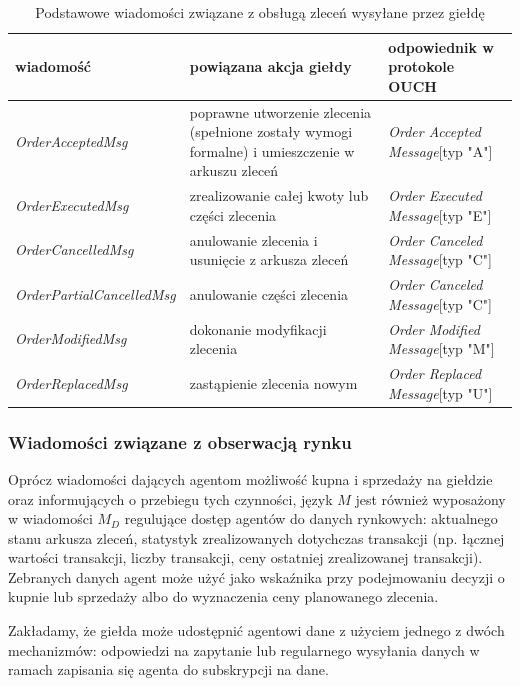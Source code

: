\begin{table}
\caption{Podstawowe wiadomości związane z obsługą zleceń wysyłane przez giełdę} 
\label{tab:ordermsgexchange}
\begin{center}
\begin{tabular}{ |p{4.5cm}|p{4.5cm}|p{4.5cm}|}
\hline
\textbf{wiadomość} & \textbf{powiązana akcja giełdy} &\textbf{odpowiednik w protokole OUCH} \\
\hline
\textit{OrderAcceptedMsg} & poprawne utworzenie zlecenia (spełnione zostały wymogi formalne) i umieszczenie w arkuszu zleceń & \textit{Order Accepted Message}[typ "A"] \\
\hline
\textit{OrderExecutedMsg} & zrealizowanie całej kwoty lub części zlecenia  & \textit{Order Executed Message}[typ "E"] \\
\hline
\textit{OrderCancelledMsg} & anulowanie zlecenia i usunięcie z arkusza zleceń & \textit{Order Canceled Message}[typ "C"] \\
\hline
\textit{OrderPartialCancelledMsg} & anulowanie części zlecenia & \textit{Order Canceled Message}[typ "C"] \\
\hline
\textit{OrderModifiedMsg} & dokonanie modyfikacji zlecenia & \textit{Order Modified Message}[typ "M"] \\
\hline
\textit{OrderReplacedMsg} & zastąpienie zlecenia nowym & \textit{Order Replaced Message}[typ "U"] \\
\hline

\end{tabular}
\end{center}

\end{table}

\subsubsection{Wiadomości związane z obserwacją rynku}

Oprócz wiadomości dających agentom możliwość kupna i sprzedaży na giełdzie oraz informujących o przebiegu tych czynności, język $M$ jest również wyposażony w wiadomości $M_D$ regulujące dostęp agentów do danych rynkowych: aktualnego stanu arkusza zleceń, statystyk zrealizowanych dotychczas transakcji (np. łącznej wartości transakcji, liczby transakcji, ceny ostatniej zrealizowanej transakcji). Zebranych danych agent może użyć jako wskaźnika przy podejmowaniu decyzji o kupnie lub sprzedaży albo do wyznaczenia ceny planowanego zlecenia. 

Zakładamy, że giełda może udostępnić agentowi dane z użyciem jednego z dwóch mechanizmów: odpowiedzi na zapytanie lub regularnego wysyłania danych w ramach zapisania się agenta do subskrypcji na dane. 

